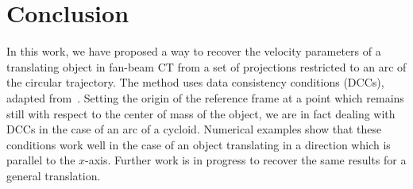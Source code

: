 \documentclass[letterpaper,twocolumn]{IEEEtran}
\begin{document}
\section{Conclusion}
In this work, we have proposed a way to recover the velocity parameters of a translating object in fan-beam CT from a set of projections restricted to an arc of the circular trajectory. The method uses data consistency conditions (DCCs), adapted from~\cite{clackdoyle2015consistency}. Setting the origin of the reference frame at a point which remains still with respect to the center of mass of the object, we are in fact dealing with DCCs in the case of an arc of a cycloid. Numerical examples show that these conditions work well in the case of an object translating in a direction which is parallel to the $x$-axis. Further work is in progress to recover the same results for a general translation.




\end{document}
